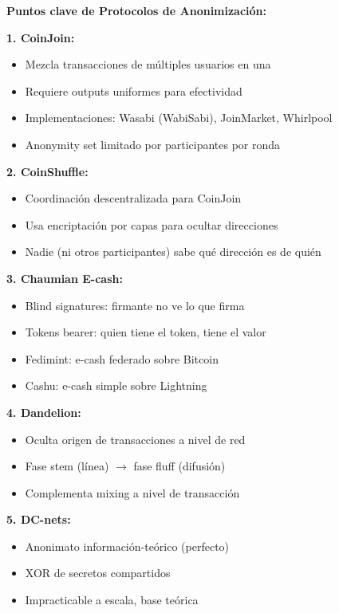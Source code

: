 \documentclass[11pt,a4paper,twoside]{book}
\begin{document}
\begin{keyidea}
\textbf{Puntos clave de Protocolos de Anonimizaci\'on:}

\textbf{1. CoinJoin:}
\begin{itemize}
    \item Mezcla transacciones de m\'ultiples usuarios en una
    \item Requiere outputs uniformes para efectividad
    \item Implementaciones: Wasabi (WabiSabi), JoinMarket, Whirlpool
    \item Anonymity set limitado por participantes por ronda
\end{itemize}

\textbf{2. CoinShuffle:}
\begin{itemize}
    \item Coordinaci\'on descentralizada para CoinJoin
    \item Usa encriptaci\'on por capas para ocultar direcciones
    \item Nadie (ni otros participantes) sabe qu\'e direcci\'on es de qui\'en
\end{itemize}

\textbf{3. Chaumian E-cash:}
\begin{itemize}
    \item Blind signatures: firmante no ve lo que firma
    \item Tokens bearer: quien tiene el token, tiene el valor
    \item Fedimint: e-cash federado sobre Bitcoin
    \item Cashu: e-cash simple sobre Lightning
\end{itemize}

\textbf{4. Dandelion:}
\begin{itemize}
    \item Oculta origen de transacciones a nivel de red
    \item Fase stem (l\'inea) $\to$ fase fluff (difusi\'on)
    \item Complementa mixing a nivel de transacci\'on
\end{itemize}

\textbf{5. DC-nets:}
\begin{itemize}
    \item Anonimato informaci\'on-te\'orico (perfecto)
    \item XOR de secretos compartidos
    \item Impracticable a escala, base te\'orica
\end{itemize}


\end{keyidea}
\end{document}

